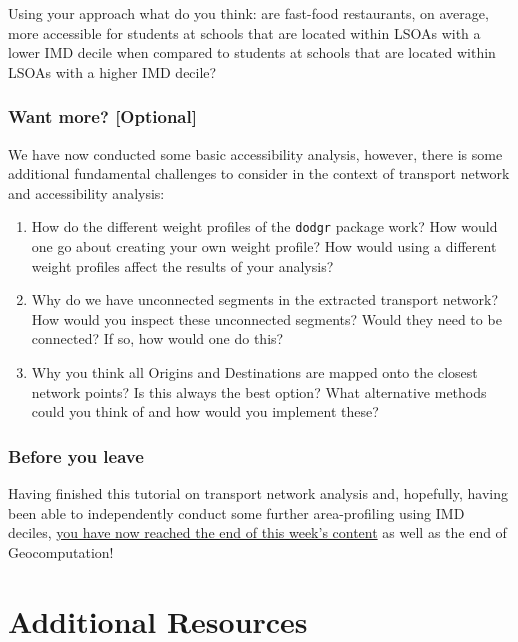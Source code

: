 \documentclass[
]{book}
\providecommand{\tightlist}{%
  \setlength{\itemsep}{0pt}\setlength{\parskip}{0pt}}
\begin{document}
Using your approach what do you think: are fast-food restaurants, on average, more accessible for students at schools that are located within LSOAs with a lower IMD decile when compared to students at schools that are located within LSOAs with a higher IMD decile?

\hypertarget{wm-w10}{%
\section{Want more? {[}Optional{]}}\label{wm-w10}}

We have now conducted some basic accessibility analysis, however, there is some additional fundamental challenges to consider in the context of transport network and accessibility analysis:

\begin{enumerate}
\def\labelenumi{\arabic{enumi}.}
\tightlist
\item
  How do the different weight profiles of the \texttt{dodgr} package work? How would one go about creating your own weight profile? How would using a different weight profiles affect the results of your analysis?
\item
  Why do we have unconnected segments in the extracted transport network? How would you inspect these unconnected segments? Would they need to be connected? If so, how would one do this?
\item
  Why you think all Origins and Destinations are mapped onto the closest network points? Is this always the best option? What alternative methods could you think of and how would you implement these?
\end{enumerate}

\hypertarget{byl-w10}{%
\section{Before you leave}\label{byl-w10}}

Having finished this tutorial on transport network analysis and, hopefully, having been able to independently conduct some further area-profiling using IMD deciles, \href{https://www.youtube.com/watch?v=fFw7q-BLxLA}{you have now reached the end of this week's content} as well as the end of Geocomputation!

\hypertarget{part-additional-resources}{%
\part*{Additional Resources}\label{part-additional-resources}}
\end{document}
